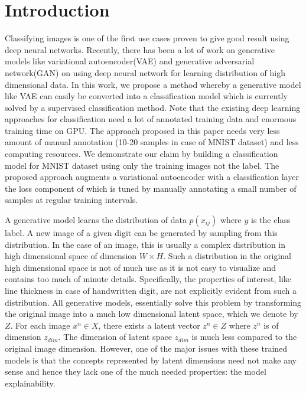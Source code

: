 \documentclass{uai2021} %
\begin{document}
\section{Introduction}\label{sec:intro}
Classifying images is one of the first use cases proven to give good result using deep neural networks.
Recently, there has been a lot of work on generative models like variational autoencoder(VAE)\cite{kingma2013auto} and generative adversarial network(GAN) \cite{goodfellow2014generative} on using deep neural network for learning distribution of high dimensional data.
In this work, we propose a method whereby a generative model like VAE can easily be converted into a classification model which is currently solved by a supervised classification method.
Note that the existing deep learning approaches for classification  need a lot of annotated training data and enormous training time on GPU\cite{krizhevsky2012imagenet}\cite{simonyan2014very}\cite{he2016deep}.
The approach proposed in this paper needs very less amount of manual annotation (10-20 samples in case of MNIST dataset)  and less computing resources.
We demonstrate our claim by building a classification model for MNIST dataset using only the training images not the label.
The proposed approach augments a  variational autoencoder with a classification layer the loss component of which is tuned by manually annotating a small number of samples at regular training intervals.


A generative model learns the distribution of data $p(x_{ij})$ where $y$ is the class label.
A new image of a given digit can be generated by sampling from this distribution.
In the case of an image, this is usually a complex distribution in high dimensional space of dimension $W \times H$.
Such a distribution in the original high dimensional space is not of much use as it is not easy to visualize and contains too much of  minute details.
Specifically, the properties of interest, like line thickness in case of handwritten digit, are not explicitly evident from such a distribution.
All generative models, essentially solve this problem by transforming the original image into a much low dimensional latent space, which we denote by  $Z$.
For each image $x^n \in X$, there exists a latent vector  $z^n \in Z$  where $z^n$ is of dimension $z_{dim}$.
The dimension of latent space $z_{dim}$ is much less compared to the original image dimension.
However, one of the major issues with these trained models is that the concepts represented by latent dimensions need not make any sense and hence they lack one of the much needed properties: the model explainability.
\end{document}
